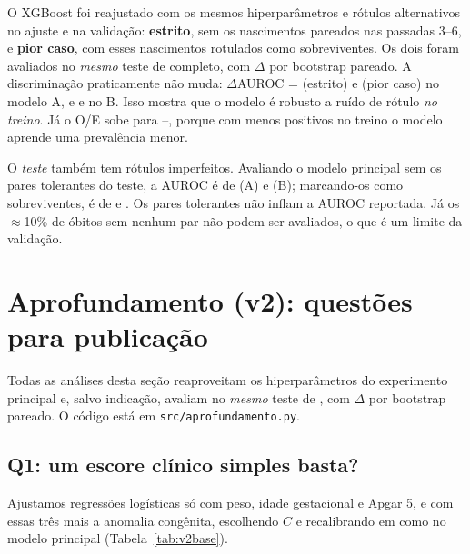 \documentclass[12pt]{article}
\begin{document}
O XGBoost foi reajustado com os mesmos hiperparâmetros e rótulos alternativos no ajuste e na validação: \textbf{estrito}, sem os nascimentos pareados nas passadas 3--6, e \textbf{pior caso}, com esses nascimentos rotulados como sobreviventes. Os dois foram avaliados no \emph{mesmo} teste de \anoTeste{} completo, com $\Delta$ por bootstrap pareado. A discriminação praticamente não muda: $\Delta$AUROC = \sensAEstDelta{} (estrito) e \sensAPiorDelta{} (pior caso) no modelo A, e \sensBEstDelta{} e \sensBPiorDelta{} no B. Isso mostra que o modelo é robusto a ruído de rótulo \emph{no treino}. Já o O/E sobe para \sensAEstOE{}--\sensBPiorOE{}, porque com menos positivos no treino o modelo aprende uma prevalência menor.

O \emph{teste} também tem rótulos imperfeitos. Avaliando o modelo principal sem os pares tolerantes do teste, a AUROC é de \testeEstrAAuroc{} (A) e \testeEstrBAuroc{} (B); marcando-os como sobreviventes, é de \testeZeroAAuroc{} e \testeZeroBAuroc{}. Os pares tolerantes não inflam a AUROC reportada. Já os $\approx$10\% de óbitos sem nenhum par não podem ser avaliados, o que é um limite da validação.

\section{Aprofundamento (v2): questões para publicação}
\label{sec:v2}

Todas as análises desta seção reaproveitam os hiperparâmetros do experimento principal e, salvo indicação, avaliam no \emph{mesmo} teste de \anoTeste{}, com $\Delta$ por bootstrap pareado. O código está em \texttt{src/aprofundamento.py}.

\subsection{Q1: um escore clínico simples basta?}

Ajustamos regressões logísticas só com peso, idade gestacional e Apgar 5, e com essas três mais a anomalia congênita, escolhendo $C$ e recalibrando em \anoValid{} como no modelo principal (Tabela~\ref{tab:v2base}).

\begin{table}[!htbp]
\centering
\caption{Q1: escores simples $\times$ XGBoost completo (teste de \anoTeste; $\Delta$ por bootstrap pareado).}
\label{tab:v2base}
\small
\setlength{\tabcolsep}{4pt}
\tabVBaseline
\end{table}
\end{document}
